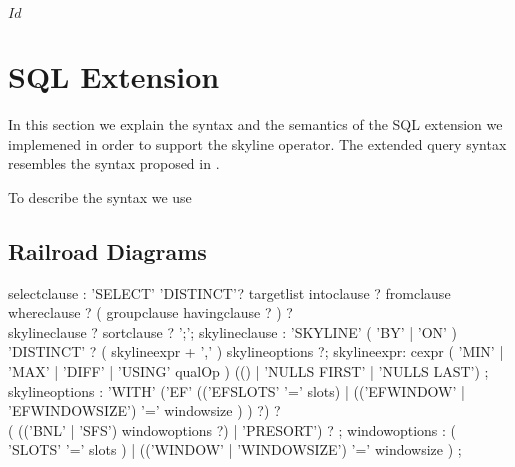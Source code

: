 
\svnInfo $Id$

\section{SQL Extension}

In this section we explain the syntax and the semantics of the SQL
extension we implemened in order to support the skyline operator. The
extended query syntax resembles the syntax proposed in
\citep{Borzsonyi2001}.

To describe the syntax we use 
\subsection{Railroad Diagrams}


\railtermfont{\ttfamily\upshape\tiny}
\railboxheight 12pt
\railinit

\begin{rail}

selectclause : 'SELECT' 'DISTINCT'? targetlist intoclause ? fromclause \\ whereclause ? ( groupclause havingclause ? ) ? \\ skylineclause ? sortclause ? ';';
skylineclause : 'SKYLINE' ( 'BY' | 'ON' ) 'DISTINCT' ? ( skylineexpr + ',' ) skylineoptions ?;
skylineexpr: cexpr ( 'MIN' | 'MAX' | 'DIFF' | 'USING' qualOp ) (() | 'NULLS FIRST' | 'NULLS LAST') ;
skylineoptions : 'WITH' ('EF' (('EFSLOTS' '=' slots) | (('EFWINDOW' | 'EFWINDOWSIZE') '=' windowsize ) ) ?) ? \\ ( (('BNL' | 'SFS') windowoptions ?) | 'PRESORT') ? ;
windowoptions : ( 'SLOTS' '=' slots ) | (('WINDOW' | 'WINDOWSIZE') '=' windowsize ) ;

\end{rail}


\newcommand\inlinesql[1]{{\tt #1}}
\newcommand\sql[1]{\inlinesql{#1}}
\newcommand\fixme[1]{{\bf FIXME (#1)}}
\newcommand\srcref[1]{{\tt #1}}


